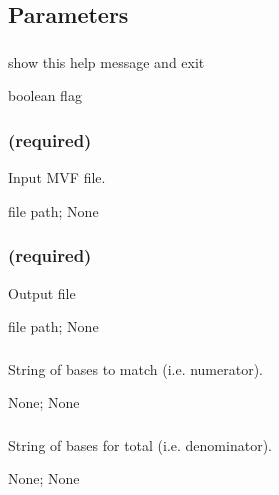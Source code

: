 \documentclass[letterpaper,11pt,english]{sphinxmanual}
\begin{document}
\subsection{Parameters}
\label{\detokenize{prog_desc:id43}}

\subsubsection{}
\label{\detokenize{prog_desc:id44}}
 show this help message and exit

 boolean flag


\subsubsection{ (required)}
\label{\detokenize{prog_desc:id45}}
 Input MVF file.

 file path;  None


\subsubsection{ (required)}
\label{\detokenize{prog_desc:id46}}
 Output file

 file path;  None


\subsubsection{}
\label{\detokenize{prog_desc:base-match-basematch}}
 String of bases to match (i.e. numerator).

 None;  None


\subsubsection{}
\label{\detokenize{prog_desc:base-total-basetotal}}
 String of bases for total (i.e. denominator).

 None;  None
\end{document}

